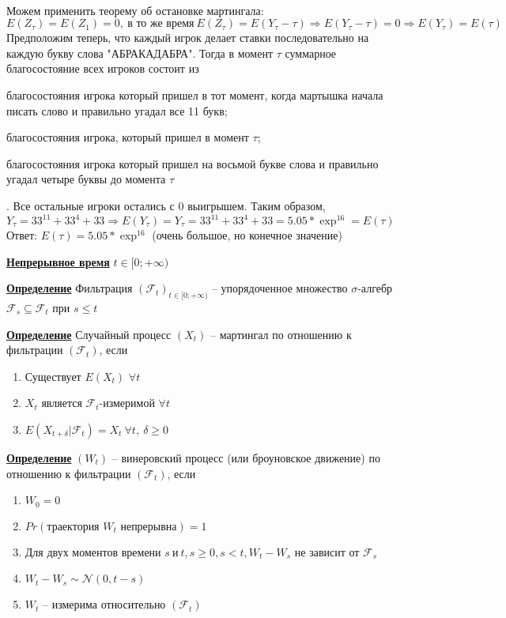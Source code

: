 \documentclass[a4paper]{article}
\begin{document}
\\ Можем применить теорему об остановке мартингала: $E({Z}_{\tau})=E({Z}_{1})=0, \ \text{в то же время} \ E({Z}_{\tau})=E({Y}_{\tau}-\tau) \Rightarrow E({Y}_{\tau}-\tau)=0 \Rightarrow E({Y}_{\tau})= E(\tau)$ \\
Предположим теперь, что каждый игрок делает ставки последовательно на каждую букву слова "АБРАКАДАБРА". Тогда в момент $\tau$ суммарное благосостояние всех игроков состоит из \begin{enumerate*}[font={\color{red!50!black}\bfseries}] \item благосостояния игрока который пришел в тот момент, когда мартышка начала писать слово и правильно угадал все 11 букв; \item благосостояния игрока, который пришел в момент  $\tau$; \item благосостояния игрока который пришел на восьмой букве слова и правильно угадал четыре буквы до момента $\tau$ \end{enumerate*}. Все остальные игроки остались с $0$ выигрышем. Таким образом, ${Y}_{\tau}=33^{11}+33^4+33 \Rightarrow E({Y}_{\tau})={Y}_{\tau}=33^{11}+33^4+33=5.05*{\exp}^{16} =E(\tau)$
\\ Ответ: $E(\tau)=5.05*{\exp}^{16}$ (очень большое, но конечное значение)
\\ \par {\bf\underline{Непрерывное время}} $t\in[0;+\infty)$
\par {\bf\underline{Определение}} Фильтрация $({\mathcal{F}_{t}})_{t\in[0;+\infty)}$ -- упорядоченное множество $\sigma$-алгебр $\mathcal{F}_{s} \subseteq \mathcal{F}_{t}$ при $s\leq t$
\par {\bf\underline{Определение}} Случайный процесс $({X}_t)$ -- мартингал по отношению к фильтрации $({\mathcal{F}_{t}})$, если \begin{enumerate}
 \item Существует $E({X}_{t})$ $\forall t$
 \item ${X}_t$ является ${\mathcal{F}_{t}}$-измеримой $\forall t$ 
 \item $E({X}_{t+\delta}|{\mathcal{F}_{t}})={X}_{t} \ \forall t, \ \delta \geq 0$
 \end{enumerate} 
\par {\bf\underline{Определение}} $({W}_t)$ -- винеровский процесс (или броуновское движение) по отношению к фильтрации $({\mathcal{F}_{t}})$, если
 \begin{enumerate}
 \item  ${W}_0=0$
 \item  $Pr(\text{траектория ${W}_t$ непрерывна})=1$
 \item  Для двух моментов времени $s\ \text{и}\ t, s \geq 0, s<t, {W}_t-{W}_s$ не зависит от $\mathcal{F}_{s}$
 \item ${W}_t-{W}_s \sim \mathcal{N}(0,t-s)$
 \item ${W}_t$ -- измерима относительно $({\mathcal{F}_{t}})$
 \end{enumerate}
\end{document}
